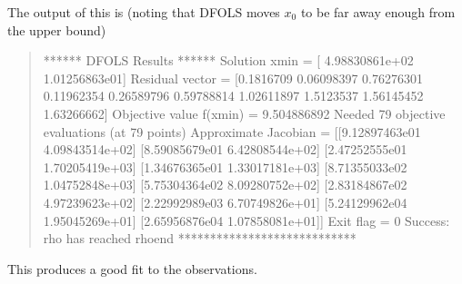 \documentclass[letterpaper,10pt,english]{sphinxmanual}
\begin{document}
\sphinxAtStartPar
The output of this is (noting that DFO\sphinxhyphen{}LS moves \(x_0\) to be far away enough from the upper bound)
\begin{quote}

\begin{sphinxVerbatim}[commandchars=\\\{\}]
****** DFO\PYGZhy{}LS Results ******
Solution xmin = [ 4.98830861e+02 \PYGZhy{}1.01256863e\PYGZhy{}01]
Residual vector = [\PYGZhy{}0.1816709   0.06098397  0.76276301  0.11962354 \PYGZhy{}0.26589796 \PYGZhy{}0.59788814
 \PYGZhy{}1.02611897 \PYGZhy{}1.5123537  \PYGZhy{}1.56145452 \PYGZhy{}1.63266662]
Objective value f(xmin) = 9.504886892
Needed 79 objective evaluations (at 79 points)
Approximate Jacobian = [[\PYGZhy{}9.12897463e\PYGZhy{}01 \PYGZhy{}4.09843514e+02]
 [\PYGZhy{}8.59085679e\PYGZhy{}01 \PYGZhy{}6.42808544e+02]
 [\PYGZhy{}2.47252555e\PYGZhy{}01 \PYGZhy{}1.70205419e+03]
 [\PYGZhy{}1.34676365e\PYGZhy{}01 \PYGZhy{}1.33017181e+03]
 [\PYGZhy{}8.71355033e\PYGZhy{}02 \PYGZhy{}1.04752848e+03]
 [\PYGZhy{}5.75304364e\PYGZhy{}02 \PYGZhy{}8.09280752e+02]
 [\PYGZhy{}2.83184867e\PYGZhy{}02 \PYGZhy{}4.97239623e+02]
 [\PYGZhy{}2.22992989e\PYGZhy{}03 \PYGZhy{}6.70749826e+01]
 [\PYGZhy{}5.24129962e\PYGZhy{}04 \PYGZhy{}1.95045269e+01]
 [\PYGZhy{}2.65956876e\PYGZhy{}04 \PYGZhy{}1.07858081e+01]]
Exit flag = 0
Success: rho has reached rhoend
****************************
\end{sphinxVerbatim}
\end{quote}

\sphinxAtStartPar
This produces a good fit to the observations.

\end{document}
